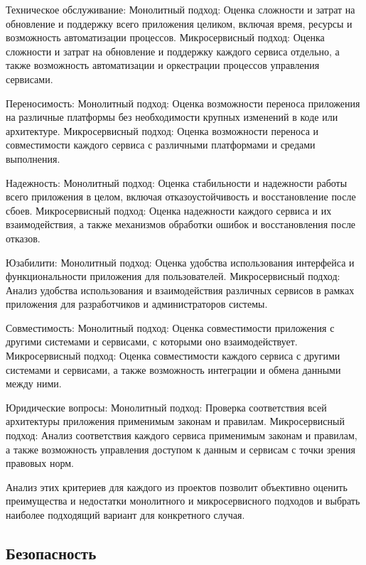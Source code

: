     Техническое обслуживание:
        Монолитный подход: Оценка сложности и затрат на обновление и поддержку всего приложения целиком, включая время, ресурсы и возможность автоматизации процессов.
        Микросервисный подход: Оценка сложности и затрат на обновление и поддержку каждого сервиса отдельно, а также возможность автоматизации и оркестрации процессов управления сервисами.

    Переносимость:
        Монолитный подход: Оценка возможности переноса приложения на различные платформы без необходимости крупных изменений в коде или архитектуре.
        Микросервисный подход: Оценка возможности переноса и совместимости каждого сервиса с различными платформами и средами выполнения.

    Надежность:
        Монолитный подход: Оценка стабильности и надежности работы всего приложения в целом, включая отказоустойчивость и восстановление после сбоев.
        Микросервисный подход: Оценка надежности каждого сервиса и их взаимодействия, а также механизмов обработки ошибок и восстановления после отказов.

    Юзабилити:
        Монолитный подход: Оценка удобства использования интерфейса и функциональности приложения для пользователей.
        Микросервисный подход: Анализ удобства использования и взаимодействия различных сервисов в рамках приложения для разработчиков и администраторов системы.

    Совместимость:
        Монолитный подход: Оценка совместимости приложения с другими системами и сервисами, с которыми оно взаимодействует.
        Микросервисный подход: Оценка совместимости каждого сервиса с другими системами и сервисами, а также возможность интеграции и обмена данными между ними.

    Юридические вопросы:
        Монолитный подход: Проверка соответствия всей архитектуры приложения применимым законам и правилам.
        Микросервисный подход: Анализ соответствия каждого сервиса применимым законам и правилам, а также возможность управления доступом к данным и сервисам с точки зрения правовых норм.

Анализ этих критериев для каждого из проектов позволит объективно оценить преимущества и недостатки монолитного и микросервисного подходов и выбрать наиболее подходящий вариант для конкретного случая.

\subsection{Безопасность}

